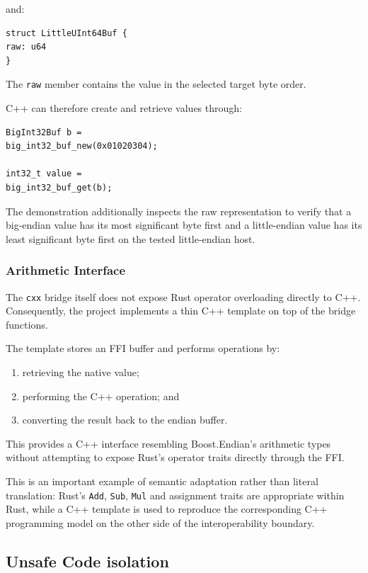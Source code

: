 and:

\begin{lstlisting}[style=rustblock]
struct LittleUInt64Buf {
raw: u64
}
\end{lstlisting}

The \texttt{raw} member contains the value in the selected target byte order.

C++ can therefore create and retrieve values through:

\begin{lstlisting}[style=cppblock]
BigInt32Buf b =
big_int32_buf_new(0x01020304);

int32_t value =
big_int32_buf_get(b);
\end{lstlisting}

The demonstration additionally inspects the raw representation to verify that a big-endian value has its most significant byte first and a 
little-endian value has its least significant byte first on the tested little-endian host.

\subsubsection{Arithmetic Interface}

The \texttt{cxx} bridge itself does not expose Rust operator overloading directly to C++. Consequently, the project implements a thin C++ 
template on top of the bridge functions.

The template stores an FFI buffer and performs operations by:

\begin{enumerate}
\item retrieving the native value;
\item performing the C++ operation; and
\item converting the result back to the endian buffer.
\end{enumerate}

This provides a C++ interface resembling Boost.Endian's arithmetic types without attempting to expose Rust's operator traits directly through 
the FFI.

This is an important example of semantic adaptation rather than literal translation: Rust's \texttt{Add}, \texttt{Sub}, \texttt{Mul} and 
assignment traits are appropriate within Rust, while a C++ template is used to reproduce the corresponding C++ programming model on the 
other side of the interoperability boundary.


\subsection{Unsafe Code isolation}

